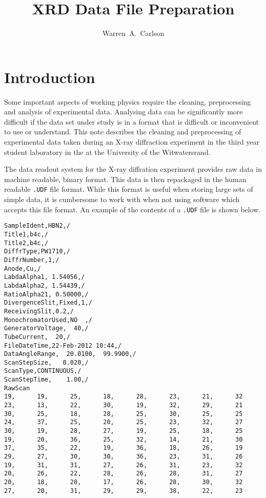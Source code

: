 \documentclass[10pt, a4paper, oneside]{article}
\author{Warren~A.~Carlson}
\title{XRD Data File Preparation}
\begin{document}
\maketitle

\section{Introduction}

\par{Some important aspects of working physics require the cleaning, preprocessing and analysis of experimental data.  Analysing data can be significantly more difficult if the data set under study is in a format that is difficult or inconvenient to use or understand.  This note describes the cleaning and preprocessing of experimental data taken during an X-ray diffraction experiment in the third year student laboratory in the \School{} at the University of the Witwatersrand.}

\par{The data readout system for the X-ray diffration experiment provides raw data in machine readable, binary format.  This data is then repackaged in the human readable \lstinline{.UDF} file format.  While this format is useful when storing large sets of simple data, it is cumbersome to work with when not using software which accepts this file format.  An example of the contents of a \lstinline{.UDF} file is shown below.}

\begin{lstlisting}
SampleIdent,HBN2,/
Title1,b4c,/
Title2,b4c,/
DiffrType,PW1710,/
DiffrNumber,1,/
Anode,Cu,/
LabdaAlpha1, 1.54056,/
LabdaAlpha2, 1.54439,/
RatioAlpha21, 0.50000,/
DivergenceSlit,Fixed,1,/
ReceivingSlit,0.2,/
MonochromatorUsed,NO  ,/
GeneratorVoltage,  40,/
TubeCurrent,  20,/
FileDateTime,22-Feb-2012 10:44,/
DataAngleRange,  20.0100,  99.9900,/
ScanStepSize,   0.020,/
ScanType,CONTINUOUS,/
ScanStepTime,    1.00,/
RawScan
19,      19,      25,      18,      28,      23,      21,      32
23,      13,      22,      30,      19,      32,      29,      21
30,      25,      18,      28,      25,      30,      25,      25
24,      37,      25,      20,      25,      23,      32,      27
30,      19,      28,      27,      19,      25,      18,      25
19,      20,      36,      25,      32,      14,      21,      30
37,      35,      22,      19,      36,      18,      26,      19
29,      27,      30,      30,      36,      23,      31,      26
19,      31,      31,      27,      26,      31,      23,      32
20,      26,      22,      28,      26,      28,      31,      27
20,      18,      28,      17,      26,      28,      30,      32
27,      20,      31,      29,      29,      38,      22,      23
\end{lstlisting}
\end{document}
